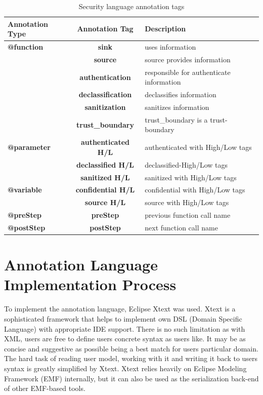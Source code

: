 \begin{table}
	\centering
\begin{tabular}{|l|c|p{9cm}|}
	\hline
	\textbf{Annotation Type} & \textbf{Annotation Tag} & \hspace{90pt}\textbf{Description}\\
	\hline

	\textbf{@function}& \textbf{sink} & uses information \\
	                  & \textbf{source}& source provides information	\\
	                  & \textbf{authentication} & responsible for authenticate information	\\
	                  & \textbf{declassification}&  declassifies information	\\
	                  & \textbf{sanitization}   & sanitizes information	\\
	                  & \textbf{trust\_boundary}& trust\_boundary is a trust-boundary\\ \hline

	\textbf{@parameter}        & \textbf{authenticated H/L}& authenticated with High/Low tags\\
					  & \textbf{declassified H/L}  & declassified-High/Low tags    \\
				      & \textbf{sanitized H/L}     & sanitized with High/Low tags    \\ \hline
	\textbf{@variable}         & \textbf{confidential H/L} & confidential with High/Low tags\\
					  & \textbf{source H/L} & source with High/Low tags   \\
	\hline
	
	\textbf{@preStep}         & \textbf{preStep}  & previous function call name\\ 	\hline
	\textbf{@postStep}        & \textbf{postStep}  & next function call name\\ 	\hline

	
\end{tabular}
\vspace{1em}
\caption{Security language annotation tags}
\label{table:Security_language_annotation_tags}
\end{table}

\section{Annotation Language Implementation Process}

To implement the annotation language, Eclipse Xtext \cite{ref_17_xtext:grammar} was used. Xtext is a sophisticated framework that helps to implement own DSL (Domain Specific Language) with appropriate IDE support. There is no such limitation as with XML, users are free to define users concrete syntax as users like. It may be as concise and suggestive as possible being a best match for users particular domain. The hard task of reading user model, working with it and writing it back to users syntax is greatly simplified by Xtext. Xtext relies heavily on Eclipse Modeling Framework (EMF) internally, but it can also be used as the serialization back-end of other EMF-based tools.  

